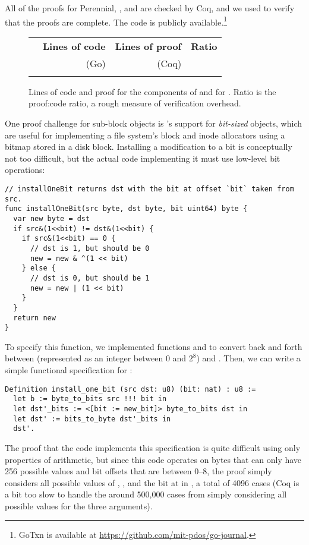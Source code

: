 All of the proofs for Perennial, \txn, and \simplenfs are checked by Coq, and we
used  to verify that the proofs are complete.  The
code is publicly available.\footnote{GoTxn is available at
\url{https://github.com/mit-pdos/go-journal}.}


\begin{figure}
\centering
\small
\begin{tabular}{lrrr}
\toprule
  & \bf Lines of code & \bf Lines of proof & \bf Ratio \\
  & (Go) & (Coq) & \\
\midrule
   \\
\bottomrule
\end{tabular}
\caption{Lines of code and proof for the components of \txn and for
\simplenfs. Ratio is the proof:code ratio, a rough measure of verification overhead.}
\label{fig:txn:loc}
\end{figure}

One proof challenge for sub-block objects is \txn's support for
\emph{bit-sized} objects, which are useful for implementing a file
system's block and inode allocators using a bitmap stored in a disk
block. Installing a modification to a bit is conceptually not too
difficult, but the actual code implementing it must use low-level bit
operations:

\begin{verbatim}
// installOneBit returns dst with the bit at offset `bit` taken from src.
func installOneBit(src byte, dst byte, bit uint64) byte {
  var new byte = dst
  if src&(1<<bit) != dst&(1<<bit) {
    if src&(1<<bit) == 0 {
      // dst is 1, but should be 0
      new = new & ^(1 << bit)
    } else {
      // dst is 0, but should be 1
      new = new | (1 << bit)
    }
  }
  return new
}
\end{verbatim}

To specify this function, we implemented functions  and
 to convert back and forth between  (represented
as an integer between 0 and $2^8$) and . Then, we can
write a simple functional specification for :

\begin{verbatim}
Definition install_one_bit (src dst: u8) (bit: nat) : u8 :=
  let b := byte_to_bits src !!! bit in
  let dst'_bits := <[bit := new_bit]> byte_to_bits dst in
  let dst' := bits_to_byte dst'_bits in
  dst'.
\end{verbatim}

The proof that the code implements this specification is quite difficult
using only properties of arithmetic, but since this code operates on
bytes that can only have 256 possible values and bit offsets that are
between 0--8, the proof simply considers all possible values of ,
, and the bit at  in , a total of 4096 cases
(Coq is a bit too slow to handle the around 500,000 cases from simply considering
all possible values for the three arguments).
